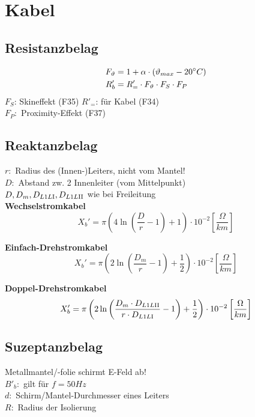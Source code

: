 \section{Kabel}

\subsection{Resistanzbelag}
\vspace{-2em}
\begin{align*}
    F_\vartheta &= 1+\alpha \cdot(\vartheta_{max} - 20\degree C)\\
    R'_b &=R'_=\cdot F_\vartheta \cdot F_S \cdot F_P
\end{align*}
$F_S$: Skineffekt (F35) \qquad $R'_=$: für Kabel (F34)\\
$F_P:$ Proximity-Effekt (F37)

\subsection{Reaktanzbelag}
\indent $r:$ Radius des (Innen-)Leiters, nicht vom Mantel!\\
\indent $D:$ Abstand zw. 2 Innenleiter (vom Mittelpunkt)\\
\indent $D,  D_m, D_{L1L\RN{1}}, D_{L1L\RN{2}}$ wie bei Freileitung\\

\textbf{Wechselstromkabel}
\begin{equation*}
    X_{b}' = \pi \left( 4 \ln \left( \frac{D}{r} -1\right) +1 \right) \cdot 10 ^{-2}   \left[\frac{\Omega}{km}\right]
\end{equation*}

\textbf{Einfach-Drehstromkabel}
\begin{equation*}
    X_{b}' = \pi \left( 2 \ln \left( \frac{D_{m}}{r} -1\right) +\frac{1}{2} \right) \cdot 10 ^{-2}   \left[\frac{\Omega}{km}\right]
\end{equation*}

\textbf{Doppel-Drehstromkabel}
\begin{equation*}
    X_{b}' = \pi \left( 2 \ln \left( \frac{D_{m} \cdot D_{L1L\RN{2}}}{r \cdot D_{L1L\RN{1}}} -1\right) +\frac{1}{2} \right) \cdot 10 ^{-2}   \left[\frac{\Omega}{km}\right]
\end{equation*}

\subsection{Suzeptanzbelag}
Metallmantel/-folie schirmt E-Feld ab!\\
\indent $B'_b:$ gilt für $f=50Hz$\\
\indent $d:$ Schirm/Mantel-Durchmesser eines Leiters\\
\indent $R:$ Radius der Isolierung\\

